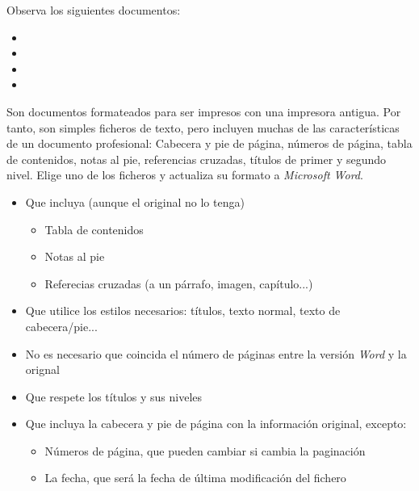 \begin{homeworkProblem}
  Observa los siguientes documentos:
  \begin{itemize}
  \item {}
  \item {}
  \item {}
  \item {}      
  \end{itemize}

  Son documentos formateados para ser impresos con una impresora antigua. Por tanto, son simples ficheros de texto, pero incluyen muchas de las características de un documento profesional: Cabecera y pie de página,  números de página,  tabla de contenidos,  notas al pie,  referencias cruzadas,  títulos de primer y segundo nivel. Elige uno de los ficheros y actualiza su formato a \textit{Microsoft Word}.

  \begin{Aviso}

    \begin{itemize}
    \item Que incluya (aunque el original no lo tenga)
      \begin{itemize}
      \item Tabla de contenidos
      \item Notas al pie
      \item Referecias cruzadas (a un párrafo, imagen, capítulo...)
      \end{itemize}
    \item Que utilice los estilos necesarios: títulos, texto normal, texto de cabecera/pie...
    \item No es necesario que coincida el número de páginas entre la versión \textit{Word} y la orignal    
    \item Que respete los títulos y sus niveles
    \item Que incluya la cabecera y pie de página con la información original, excepto:
      \begin{itemize}
      \item Números de página, que pueden cambiar si cambia la paginación
      \item La fecha, que será la fecha de última modificación del fichero
      \end{itemize}
    \end{itemize}
  \end{Aviso}
\end{homeworkProblem}

